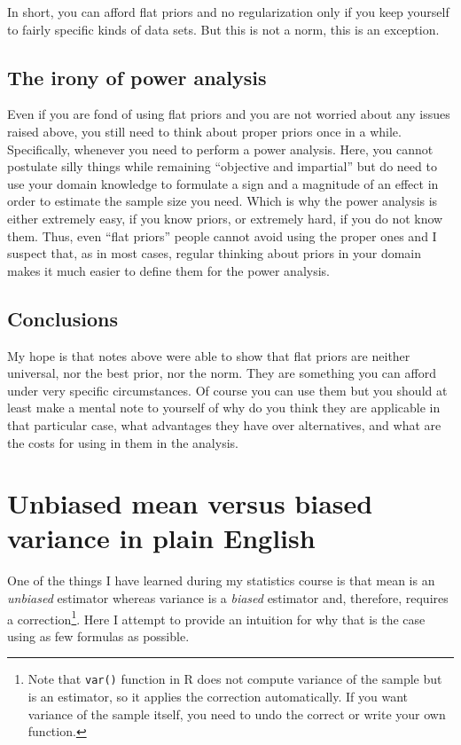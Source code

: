 \documentclass[
]{book}
\begin{document}
In short, you can afford flat priors and no regularization only if you keep yourself to fairly specific kinds of data sets. But this is not a norm, this is an exception.

\hypertarget{the-irony-of-power-analysis}{%
\section{The irony of power analysis}\label{the-irony-of-power-analysis}}

Even if you are fond of using flat priors and you are not worried about any issues raised above, you still need to think about proper priors once in a while. Specifically, whenever you need to perform a power analysis. Here, you cannot postulate silly things while remaining ``objective and impartial'' but do need to use your domain knowledge to formulate a sign and a magnitude of an effect in order to estimate the sample size you need. Which is why the power analysis is either extremely easy, if you know priors, or extremely hard, if you do not know them. Thus, even ``flat priors'' people cannot avoid using the proper ones and I suspect that, as in most cases, regular thinking about priors in your domain makes it much easier to define them for the power analysis.

\hypertarget{conclusions-1}{%
\section{Conclusions}\label{conclusions-1}}

My hope is that notes above were able to show that flat priors are neither universal, nor the best prior, nor the norm. They are something you can afford under very specific circumstances. Of course you can use them but you should at least make a mental note to yourself of why do you think they are applicable in that particular case, what advantages they have over alternatives, and what are the costs for using in them in the analysis.

\hypertarget{unbiased-mean-versus-biased-variance-in-plain-english}{%
\chapter{Unbiased mean versus biased variance in plain English}\label{unbiased-mean-versus-biased-variance-in-plain-english}}

One of the things I have learned during my statistics course is that mean is an \emph{unbiased} estimator whereas variance is a \emph{biased} estimator and, therefore, requires a correction\footnote{Note that \texttt{var()} function in R does not compute variance of the sample but is an estimator, so it applies the correction automatically. If you want variance of the sample itself, you need to undo the correct or write your own function.}. Here I attempt to provide an intuition for why that is the case using as few formulas as possible.
\end{document}
